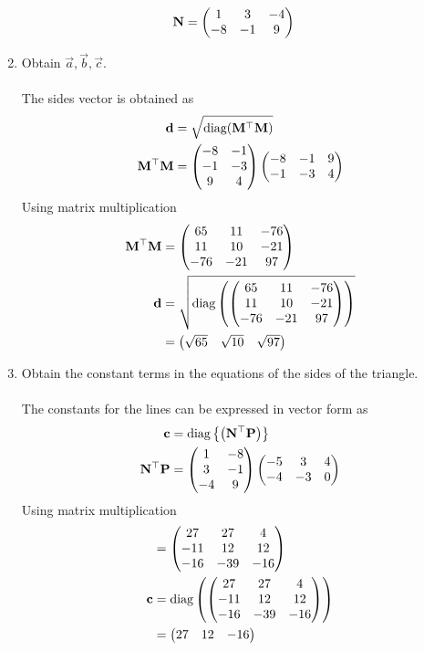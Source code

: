 \documentclass[10pt]{book}
\begin{document}
\begin{enumerate}[label=\thesubsection.\arabic*.,ref=\thesubsection.\theenumi]
\begin{align}
   \mathbf{N} &= \begin{pmatrix}1 & 3 & -4 \\ -8 & -1 & 9\end{pmatrix}
\end{align}
\item Obtain $\vec{a}, \vec{b}, \vec{c}$. \\
\solution \\
The sides vector is obtained as
\begin{align}
\mathbf{d} &= \sqrt{\text{diag}(\mathbf{M}^{\top}\mathbf{M})}\\
\mathbf{M}^{\top}\mathbf{M} &= \begin{pmatrix}-8 &-1 \\ -1 &-3 \\ 9 &4\end{pmatrix}\begin{pmatrix}-8 & -1 & 9 \\ -1 & -3 & 4\end{pmatrix}
\end{align} 
Using matrix multiplication 
\begin{align}
    \mathbf{M}^{\top}\mathbf{M} &= \begin{pmatrix} 65 & 11 & -76 \\ 11 & 10 & -21 \\ -76 & -21 & 97\end{pmatrix} \\
    \mathbf{d} &= \sqrt{\text{diag}\left(\begin{pmatrix} 65 & 11 & -76 \\ 11 & 10 & -21 \\ -76 & -21 & 97\end{pmatrix}\right)} \\
    &= \begin{pmatrix} \sqrt{65} & \sqrt{10} & \sqrt{97}\end{pmatrix}
\end{align}
\item Obtain the constant terms in the equations of the sides of the triangle.\\
\solution \\The constants for the lines can be expressed in vector form as
\begin{align}
\mathbf{c} &= \text{diag}\left\{\left(\mathbf{N}^{\top}\mathbf{P}\right)\right\}  \\
\mathbf{N}^{\top}\mathbf{P} &= \begin{pmatrix}1&-8 \\ 3&-1 \\ -4 &9\end{pmatrix}\begin{pmatrix}-5 & 3 & 4 \\ -4 & -3 & 0\end{pmatrix} \\
\end{align}
Using matrix multiplication
\begin{align}
    &=\begin{pmatrix} 27 & 27 & 4 \\ -11 & 12 & 12 \\ -16 & -39 & -16 \end{pmatrix} \\
    \mathbf{c} &= \text{diag}\left( \begin{pmatrix} 27 & 27 & 4 \\ -11 & 12 & 12 \\ -16 & -39 & -16 \end{pmatrix}\right) \\
    &= \begin{pmatrix} 27 & 12 & -16\end{pmatrix}
\end{align}
\end{enumerate}
\end{document}
